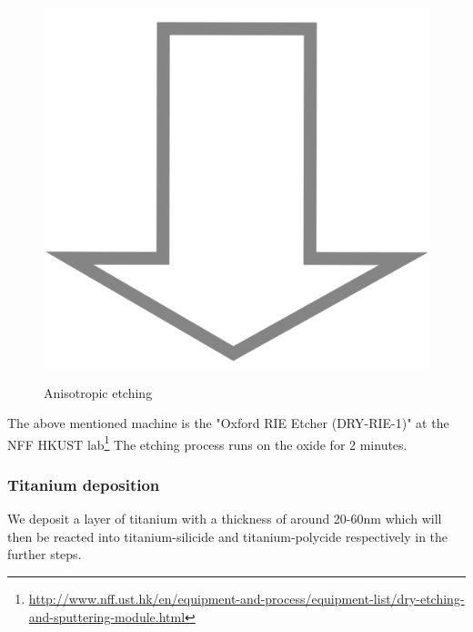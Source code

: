 \begin{figure}[H]
	\centering
	\begin{tikzpicture}[node distance = 3cm, auto, thick,scale=\CrossSectionOnly, every node/.style={transform shape}]
		
	\end{tikzpicture}\\
	\includegraphics[scale=0.01]{down_arrow.png}\\
	\begin{tikzpicture}[node distance = 3cm, auto, thick,scale=\CrossSectionOnly, every node/.style={transform shape}]
		
	\end{tikzpicture}
	\caption{Anisotropic etching}
\end{figure}

The above mentioned machine is the "Oxford RIE Etcher (DRY-RIE-1)" at the NFF HKUST lab\footnote{\url{http://www.nff.ust.hk/en/equipment-and-process/equipment-list/dry-etching-and-sputtering-module.html}}
The etching process runs on the oxide for 2 minutes.

\newpage

\subsubsection{Titanium deposition}

We deposit a layer of titanium with a thickness of around 20-60nm which will then be reacted into titanium-silicide and titanium-polycide respectively in the further steps.


